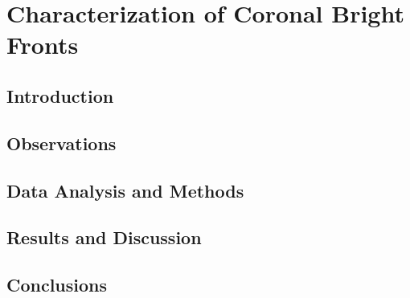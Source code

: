 \chapter{Characterization of Coronal Bright Fronts}
\label{chapter2}

\section{Introduction}

\section{Observations}

\section{Data Analysis and Methods}

\section{Results and Discussion}

\section{Conclusions}



